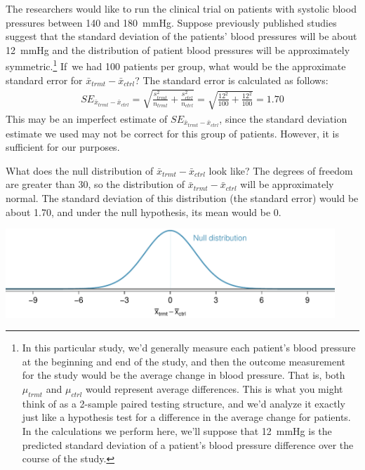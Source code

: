 \begin{example}{The researchers would like to run the clinical trial on patients with systolic blood pressures between 140 and 180~mmHg. Suppose previously published studies suggest that the standard deviation of the patients' blood pressures will be about 12~mmHg and the distribution of patient blood pressures will be approximately symmetric.\footnote{In this particular study, we'd generally measure each patient's blood pressure at the beginning and end of the study, and then the outcome measurement for the study would be the average change in blood pressure. That is, both $\mu_{trmt}$ and $\mu_{ctrl}$ would represent average differences. This is what you might think of as a 2-sample paired testing structure, and we'd analyze it exactly just like a hypothesis test for a difference in the average change for patients. In the calculations we perform here, we'll suppose that 12~mmHg is the predicted standard deviation of a patient's blood pressure difference over the course of the study.} If~we had 100 patients per group, what would be the approximate standard error for $\bar{x}_{trmt} - \bar{x}_{ctrl}$?}
The standard error is calculated as follows:
\begin{align*}
SE_{\bar{x}_{trmt} - \bar{x}_{ctrl}}
  = \sqrt{\frac{s_{trmt}^2}{n_{trmt}} + \frac{s_{ctrl}^2}{n_{ctrl}}}
  = \sqrt{\frac{12^2}{100} + \frac{12^2}{100}}
  = 1.70
\end{align*}
This may be an imperfect estimate of $SE_{\bar{x}_{trmt} - \bar{x}_{ctrl}}$, since the standard deviation estimate we used may not be correct for this group of patients. However, it is sufficient for our purposes.
\end{example}

\begin{example}{What does the null distribution of $\bar{x}_{trmt} - \bar{x}_{ctrl}$ look like?}
The degrees of freedom are greater than 30, so the distribution of $\bar{x}_{trmt} - \bar{x}_{ctrl}$ will be approximately normal. The standard deviation of this distribution (the standard error) would be about 1.70, and under the null hypothesis, its mean would be 0.
\begin{center}
\includegraphics[width=0.93\textwidth]{ch_inference_for_means/figures/power_null_0_1-7/power_null_A_0_1-7}
\end{center}
\end{example}

